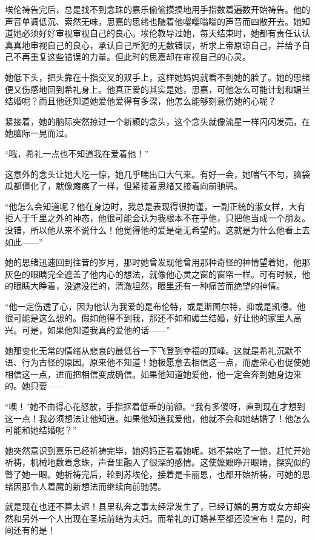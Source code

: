 \par 埃伦祷告完后，总是找不到念珠的嘉乐偷偷摸摸地用手指数着遍数开始祷告。他的声音单调低沉、索然无味，思嘉的思绪也随着他嘤嘤嗡嗡的声音而四散开去。她知道她必须好好审视审视自己的良心。埃伦教导过她，每天结束时，她都有责任认认真真地审视自己的良心，承认自己所犯的无数错误，祈求上帝原谅自己，并给予自己不再重复这些错误的力量。但此时的思嘉却在审视自己的心灵。
\par 她低下头，把头靠在十指交叉的双手上，这样她妈妈就看不到她的脸了。她的思绪便又伤感地回到希礼身上。他真正爱的其实是她，思嘉，可他怎么可能计划和媚兰结婚呢？而且他还知道她爱他爱得有多深，他怎么能够刻意伤她的心呢？
\par 紧接着，她的脑际突然掠过一个新颖的念头，这个念头就像流星一样闪闪发亮，在她脑际一晃而过。
\par “哦，希礼一点也不知道我在爱着他！”
\par 这意外的念头让她大吃一惊，她几乎喘出口大气来。有好一会，她喘气不匀，脑袋瓜都僵化了，就像瘫痪了一样，但紧接着思绪又接着向前驰骋。
\par “他怎么会知道呢？他在身边时，我总是表现得很拘谨，一副正统的淑女样，大有拒人于千里之外的神态，他很可能会认为我根本不在乎他，只把他当成一个朋友。没错，所以他从来不说什么！他觉得他的爱是毫无希望的。这就是为什么他看上去如此——”
\par 她的思绪迅速回到往昔的岁月，那时她曾发现他曾用那种奇怪的神情望着她，他那灰色的眼睛完全遮盖了他内心的想法，就像他心灵之窗的窗帘一样。可有时候，他的眼睛大睁着，没遮没拦的，清澈坦然，眼里还有一种痛苦而绝望的神情。
\par “他一定伤透了心，因为他认为我爱的是布伦特，或是斯图尔特，抑或是凯德。他很可能是这么想的。假如他得不到我，那还不如和媚兰结婚，好让他的家里人高兴。可是，如果他知道我真的爱他的话——”
\par 她那变化无常的情绪从悲哀的最低谷一下飞登到幸福的顶峰。这就是希礼沉默不语、行为古怪的原因。原来他不知道！她极愿意去相信这一点，而虚荣心也促使她相信这一点，进而把相信变成确信。如果他知道她爱他，他一定会奔到她身边来的。她只要——
\par “噢！”她不由得心花怒放，手指抠着低垂的前额。“我有多傻呀，直到现在才想到这一点！我必须想法让他知道。如果他知道我爱他，他就不会和她结婚了！他怎么可能和她结婚呢？”
\par 她突然意识到嘉乐已经祈祷完毕，她妈妈正看着她呢。她不禁吃了一惊，赶忙开始祈祷，机械地数着念珠，声音里融入了很深的感情。这使嬷嬷睁开眼睛，探究似的瞥了她一眼。她祈祷完后，轮到苏埃伦，接着是卡丽恩，也都开始祈祷，可她的思绪因那令人着魔的新想法而继续向前驰骋。
\par 就是现在也还不算太迟！县里私奔之事太经常发生了，已经订婚的男方或女方却突然和另外一个人出现在圣坛前结为夫妇。而希礼的订婚甚至都还没宣布！是的，时间还有的是！
